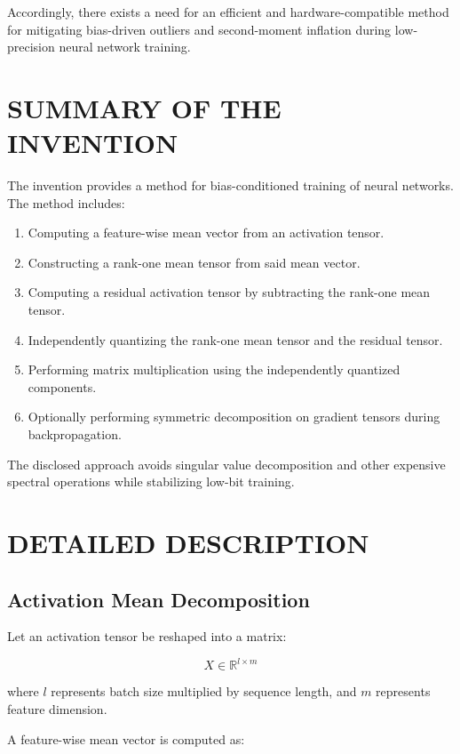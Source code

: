 \documentclass[12pt]{article}
\begin{document}
Accordingly, there exists a need for an efficient and hardware-compatible method for mitigating bias-driven outliers and second-moment inflation during low-precision neural network training.

\section{SUMMARY OF THE INVENTION}

The invention provides a method for bias-conditioned training of neural networks. The method includes:

\begin{enumerate}
    \item Computing a feature-wise mean vector from an activation tensor.
    \item Constructing a rank-one mean tensor from said mean vector.
    \item Computing a residual activation tensor by subtracting the rank-one mean tensor.
    \item Independently quantizing the rank-one mean tensor and the residual tensor.
    \item Performing matrix multiplication using the independently quantized components.
    \item Optionally performing symmetric decomposition on gradient tensors during backpropagation.
\end{enumerate}

The disclosed approach avoids singular value decomposition and other expensive spectral operations while stabilizing low-bit training.

\newpage

\section{DETAILED DESCRIPTION}

\subsection{Activation Mean Decomposition}

Let an activation tensor be reshaped into a matrix:

\[
X \in \mathbb{R}^{l \times m}
\]

where $l$ represents batch size multiplied by sequence length, and $m$ represents feature dimension.

A feature-wise mean vector is computed as:
\end{document}
